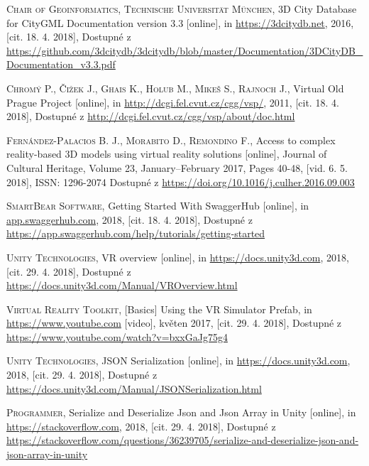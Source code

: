 \documentclass[thesis=B,czech]{FITthesis}[2012/06/26]
\begin{document}
\begin{thebibliography}{999}

  \textsc{Chair of Geoinformatics, Technische Universität München},
  3D City Database for CityGML Documentation version 3.3 [online],
  in \url{https://3dcitydb.net}, 2016,
  [cit. 18. 4. 2018],
  Dostupné z \url{https://github.com/3dcitydb/3dcitydb/blob/master/Documentation/3DCityDB_Documentation_v3.3.pdf}
  
  \textsc{Chromý P., Čižek J., Ghais K., Holub M., Mikeš S., Rajnoch J.},
  Virtual Old Prague Project [online],
  in \url{http://dcgi.fel.cvut.cz/cgg/vsp/}, 2011,
  [cit. 18. 4. 2018],
  Dostupné z \url{http://dcgi.fel.cvut.cz/cgg/vsp/about/doc.html}
  
  
  \textsc{Fernández-Palacios B. J., Morabito D., Remondino F.},
  Access to complex reality-based 3D models using virtual reality
solutions [online],
  Journal of Cultural Heritage, Volume 23, January–February 2017, Pages 40-48,
  [vid. 6. 5. 2018],
  ISSN: 1296-2074
  Dostupné z \url{https://doi.org/10.1016/j.culher.2016.09.003}
  
  
  \textsc{SmartBear Software},
  Getting Started With SwaggerHub [online],
  in \url{app.swaggerhub.com}, 2018,
  [cit. 18. 4. 2018],
  Dostupné z \url{https://app.swaggerhub.com/help/tutorials/getting-started}
  
  
  
  \textsc{Unity Technologies},
  VR overview [online],
  in \url{https://docs.unity3d.com}, 2018,
  [cit. 29. 4. 2018],
  Dostupné z \url{https://docs.unity3d.com/Manual/VROverview.html}
  
  \textsc{Virtual Reality Toolkit},
  [Basics] Using the VR Simulator Prefab,
  in \url{https://www.youtube.com} [video], květen 2017,
  [cit. 29. 4. 2018],
  Dostupné z \url{https://www.youtube.com/watch?v=bxxGaJg75g4}
  
  
  \textsc{Unity Technologies},
  JSON Serialization [online],
  in \url{https://docs.unity3d.com}, 2018,
  [cit. 29. 4. 2018],
  Dostupné z \url{https://docs.unity3d.com/Manual/JSONSerialization.html}
  
  \textsc{Programmer},
  Serialize and Deserialize Json and Json Array in Unity [online],
  in \url{https://stackoverflow.com}, 2018,
  [cit. 29. 4. 2018],
  Dostupné z \url{https://stackoverflow.com/questions/36239705/serialize-and-deserialize-json-and-json-array-in-unity}
 

\end{thebibliography}
\end{document}
